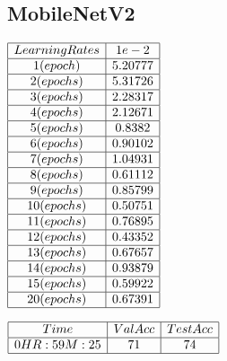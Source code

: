 \documentclass[conference]{IEEEtran}
\begin{document}
\subsection{MobileNetV2} \label{MobileNetV2}
\begin{center}
    $\begin{array}{| c | c |}
            \hline 
                Learning Rates & 1{e-2} \\ 
            \hline 
                1 (epoch)    & 5.20777 \\ 
            \hline 
                2 (epochs)  & 5.31726 \\
            \hline
                3 (epochs)  & 2.28317 \\
            \hline
                4 (epochs)  & 2.12671 \\
            \hline
                5 (epochs)  & 0.8382 \\
            \hline
                6 (epochs) & 0.90102 \\
            \hline
                7 (epochs) & 1.04931 \\
            \hline
                8 (epochs) & 0.61112 \\
            \hline
                9 (epochs) & 0.85799 \\
            \hline
                10 (epochs) & 0.50751 \\
            \hline
                11 (epochs) & 0.76895 \\
            \hline
                12 (epochs) & 0.43352 \\
            \hline
                13 (epochs) & 0.67657 \\
            \hline
                14 (epochs) & 0.93879 \\
            \hline
                15 (epochs) & 0.59922 \\
            \hline
                20 (epochs) & 0.67391 \\
            \hline
    \end{array}$
\end{center}
\begin{center}
    $\begin{array}{| c | c | c | c |}
            \hline 
                Time & Val Acc & Test Acc \\ 
            \hline 
                0HR:59M:25 & 71 & 74\\ 
            \hline
    \end{array}$
\end{center}
\end{document}
